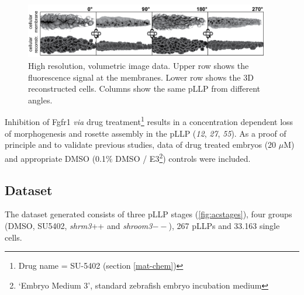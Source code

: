 \documentclass[11pt,singlespacinge,twoside]{reedthesis} %
\begin{document}
\begin{figure}

{\centering \includegraphics[width=0.95\textwidth]{figures/results/04_constriction/reconstriction_data} 

}

\caption[High resolution, volumetric image data]{High resolution, volumetric image data. Upper row shows the fluorescence signal at the membranes. Lower row shows the 3D reconstructed cells. Columns show the same pLLP from different angles.}\label{fig:acdata}
\end{figure}
Inhibition of Fgfr1 \emph{via} drug treatment\footnote{Drug name = SU-5402 (section \ref{mat-chem})} results in a concentration dependent loss of morphogenesis and rosette assembly in the pLLP (\emph{12}, \emph{27}, \emph{55}). As a proof of principle and to validate previous studies, data of drug treated embryos (20 \(\mu\)M) and appropriate DMSO (0.1\(\%\) DMSO / E3\footnote{`Embryo Medium 3', standard zebrafish embryo incubation medium}) controls were included.

\hypertarget{dataset-3}{%
\subsection{Dataset}\label{dataset-3}}

The dataset generated consists of three pLLP stages (\ref{fig:acstages}), four groups (DMSO, SU5402, \emph{shrm3}++ and \emph{shroom3}\(--\)), 267 pLLPs and 33.163 single cells.\newline
\end{document}
